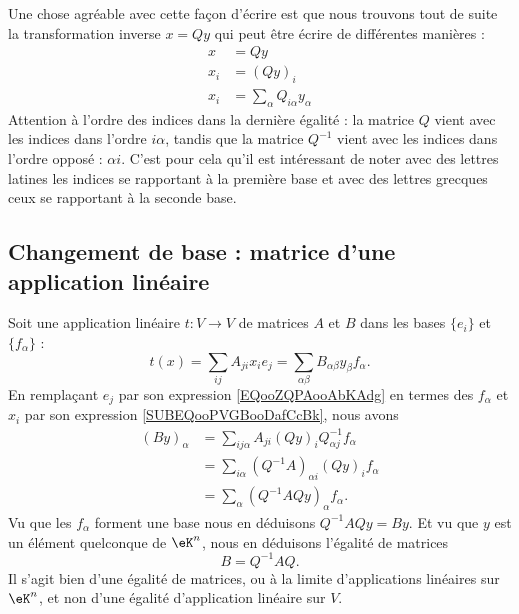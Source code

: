 Une chose agréable avec cette façon d'écrire est que nous trouvons tout de suite la transformation inverse \( x=Qy\) qui peut être écrire de différentes manières :
\begin{subequations}
    \begin{align}
        x&=Qy\\
        x_i&=(Qy)_i   \label{SUBEQooPVGBooDafCcBk}  \\
        x_i&=\sum_{\alpha}Q_{i\alpha}y_{\alpha}
    \end{align}
\end{subequations}
Attention à l'ordre des indices dans la dernière égalité : la matrice \( Q\) vient avec les indices dans l'ordre \( i\alpha\), tandis que la matrice \( Q^{-1}\) vient avec les indices dans l'ordre opposé : \( \alpha i\). C'est pour cela qu'il est intéressant de noter avec des lettres latines les indices se rapportant à la première base et avec des lettres grecques ceux se rapportant à la seconde base.

\subsection{Changement de base : matrice d'une application linéaire}

Soit une application linéaire \( t\colon V\to V\) de matrices \( A\) et \( B\) dans les bases \( \{ e_i \}\) et \( \{ f_{\alpha} \}\) :
\begin{equation}
    t(x)=\sum_{ij}A_{ji}x_ie_j=\sum_{\alpha\beta}B_{\alpha\beta}y_{\beta}f_{\alpha}.
\end{equation}
En remplaçant \( e_j\) par son expression \eqref{EQooZQPAooAbKAdg} en termes des \( f_{\alpha}\) et \( x_i\) par son expression \eqref{SUBEQooPVGBooDafCcBk}, nous avons
\begin{subequations}
    \begin{align}
        (By)_{\alpha}&=\sum_{ij\alpha}A_{ji}(Qy)_iQ^{-1}_{\alpha j}f_{\alpha}\\
        &=\sum_{i \alpha}(Q^{-1}A)_{\alpha i}(Qy)_if_{\alpha}\\
        &=\sum_{\alpha}(Q^{-1} AQy)_{\alpha}f_{\alpha}.
    \end{align}
\end{subequations}
Vu que les \( f_{\alpha}\) forment une base nous en déduisons \( Q^{-1}AQy=By\). Et vu que \( y\) est un élément quelconque de \( \eK^n\), nous en déduisons l'égalité de matrices
\begin{equation}        \label{ooWKTYooOJfclT}
    B=Q^{-1}AQ.
\end{equation}
Il s'agit bien d'une égalité de matrices, ou à la limite d'applications linéaires sur \( \eK^n\), et non d'une égalité d'application linéaire sur \( V\).

